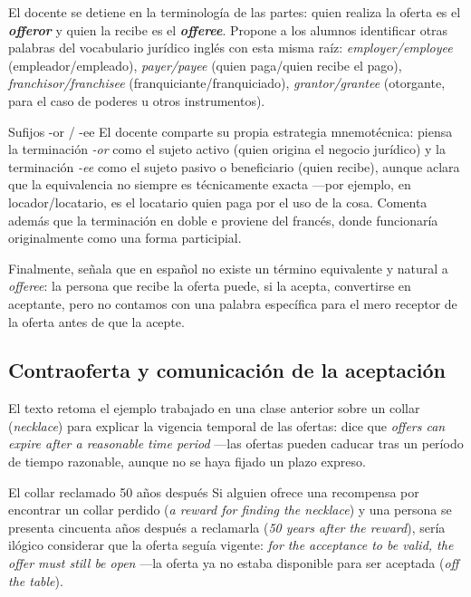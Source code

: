 \documentclass[12pt,oneside]{book}
\begin{document}
El docente se detiene en la terminología de las partes: quien realiza la oferta es el \textbf{\textit{offeror}} y quien la recibe es el \textbf{\textit{offeree}}. Propone a los alumnos identificar otras palabras del vocabulario jurídico inglés con esta misma raíz: \textit{employer/employee} (empleador/empleado), \textit{payer/payee} (quien paga/quien recibe el pago), \textit{franchisor/franchisee} (franquiciante/franquiciado), \textit{grantor/grantee} (otorgante, para el caso de poderes u otros instrumentos).

\begin{definition}{Sufijos -or / -ee}
El docente comparte su propia estrategia mnemotécnica: piensa la terminación \textit{-or} como el sujeto activo (quien origina el negocio jurídico) y la terminación \textit{-ee} como el sujeto pasivo o beneficiario (quien recibe), aunque aclara que la equivalencia no siempre es técnicamente exacta —por ejemplo, en locador/locatario, es el locatario quien paga por el uso de la cosa. Comenta además que la terminación en doble e proviene del francés, donde funcionaría originalmente como una forma participial.
\end{definition}

Finalmente, señala que en español no existe un término equivalente y natural a \textit{offeree}: la persona que recibe la oferta puede, si la acepta, convertirse en aceptante, pero no contamos con una palabra específica para el mero receptor de la oferta antes de que la acepte.

\subsection{Contraoferta y comunicación de la aceptación}

El texto retoma el ejemplo trabajado en una clase anterior sobre un collar (\textit{necklace}) para explicar la vigencia temporal de las ofertas: dice que \textit{offers can expire after a reasonable time period} —las ofertas pueden caducar tras un período de tiempo razonable, aunque no se haya fijado un plazo expreso.

\begin{example}{El collar reclamado 50 años después}
Si alguien ofrece una recompensa por encontrar un collar perdido (\textit{a reward for finding the necklace}) y una persona se presenta cincuenta años después a reclamarla (\textit{50 years after the reward}), sería ilógico considerar que la oferta seguía vigente: \textit{for the acceptance to be valid, the offer must still be open} —la oferta ya no estaba disponible para ser aceptada (\textit{off the table}).
\end{example}
\end{document}

